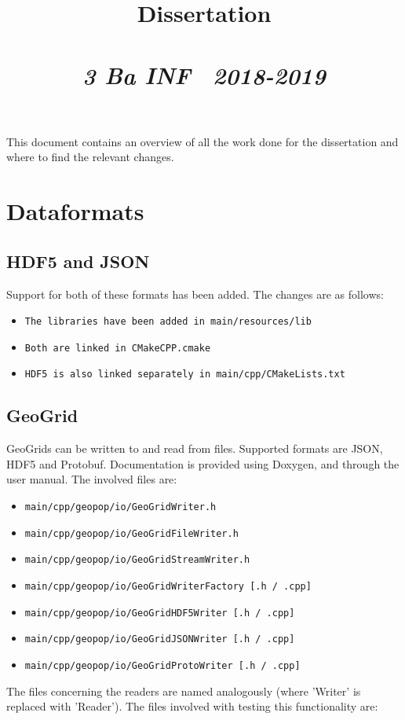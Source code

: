 \documentclass{article}
\title{\textmd{\textbf{Dissertation}}\\\normalsize\vspace{0.1in}\Large{\assignmentname}\\\vspace{0.1in}\small{\textit{3 Ba INF \  2018-2019}}}
\author{\studentA}
\date{}
\begin{document}
\maketitle

This document contains an overview of all the work done for the dissertation and where to find the relevant changes.

\section{Dataformats}
\subsection{HDF5 and JSON}
Support for both of these formats has been added. The changes are as follows:

\begin{itemize}
\item \texttt{The libraries have been added in main/resources/lib}
\item \texttt{Both are linked in CMakeCPP.cmake}
\item \texttt{HDF5 is also linked separately in main/cpp/CMakeLists.txt}
\end{itemize}

\subsection{GeoGrid}
GeoGrids can be written to and read from files. Supported formats are JSON, HDF5 and Protobuf. Documentation is provided using Doxygen, and through the user manual.
The involved files are:

\begin{itemize}
\item \texttt{main/cpp/geopop/io/GeoGridWriter.h}
\item \texttt{main/cpp/geopop/io/GeoGridFileWriter.h}
\item \texttt{main/cpp/geopop/io/GeoGridStreamWriter.h}
\item \texttt{main/cpp/geopop/io/GeoGridWriterFactory [.h / .cpp]}
\item \texttt{main/cpp/geopop/io/GeoGridHDF5Writer [.h / .cpp]}
\item \texttt{main/cpp/geopop/io/GeoGridJSONWriter [.h / .cpp]}
\item \texttt{main/cpp/geopop/io/GeoGridProtoWriter [.h / .cpp]}
\end{itemize}

The files concerning the readers are named analogously (where 'Writer' is replaced with 'Reader').
The files involved with testing this functionality are:
\end{document}
